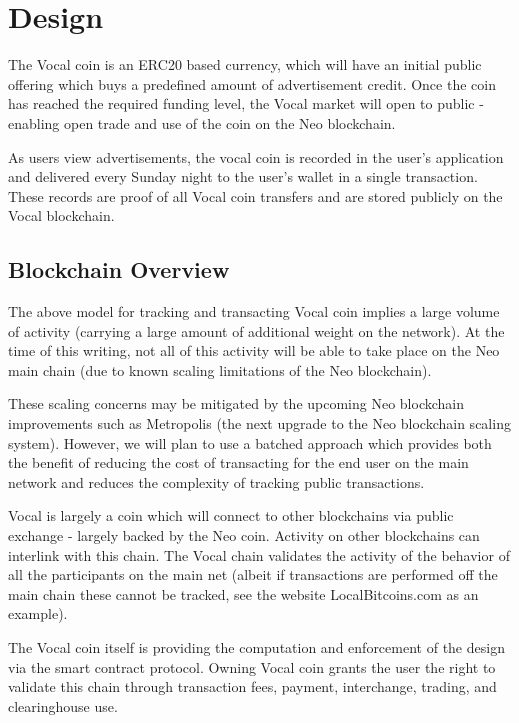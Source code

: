 \documentclass[conference]{IEEEtran}
\begin{document}
    \section{Design}

    The Vocal coin is an ERC20 based currency, which will have an initial public offering which buys a predefined amount of advertisement credit. Once the coin has reached the required funding level, the Vocal market will open to public - enabling open trade and use of the coin on the Neo blockchain.

    As users view advertisements, the vocal coin is recorded in the user's application and delivered every Sunday night to the user's wallet in a single transaction. 
    These records are proof of all Vocal coin transfers and are stored publicly on the Vocal blockchain. 


    \subsection{Blockchain Overview}

    The above model for tracking and transacting Vocal coin implies a large volume of activity (carrying a large amount of additional weight on the network). At the time of this writing, not all of this activity will be able to take place on the Neo main chain (due to known scaling limitations of the Neo blockchain).


    These scaling concerns may be mitigated by the upcoming Neo blockchain improvements such as Metropolis (the next upgrade to the Neo blockchain scaling system). However, we will plan to use a batched approach which provides both the benefit of reducing the cost of transacting for the end user on the main network and reduces the complexity of tracking public transactions.

   Vocal is largely a coin which will connect to other blockchains via public exchange - largely backed by the Neo coin. Activity on other blockchains can interlink with this chain. The Vocal chain validates the activity of the behavior of all the participants on the main net (albeit if transactions are performed off the main chain these cannot be tracked, see the website LocalBitcoins.com as an example).

    The Vocal coin itself is providing the computation and enforcement of the design via the smart contract protocol. Owning Vocal coin grants the user the right to validate this chain through transaction fees, payment, interchange, trading, and clearinghouse use. 
\end{document}

